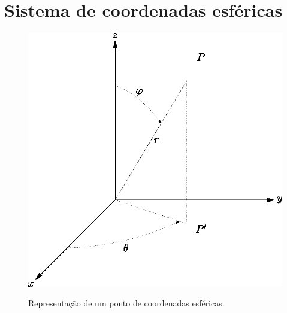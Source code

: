  \section{Sistema de coordenadas esféricas}
\begin{figure}%
\begin{center}
      \includegraphics{./cap_algvet/figs/coordenadas_esfericas}
   \caption{Representação de um ponto de coordenadas esféricas.}\label{./cap_algvet/figs/coo_esf}
      \label{fig:coordenadas_esfericas}
        \end{center}\end{figure}


